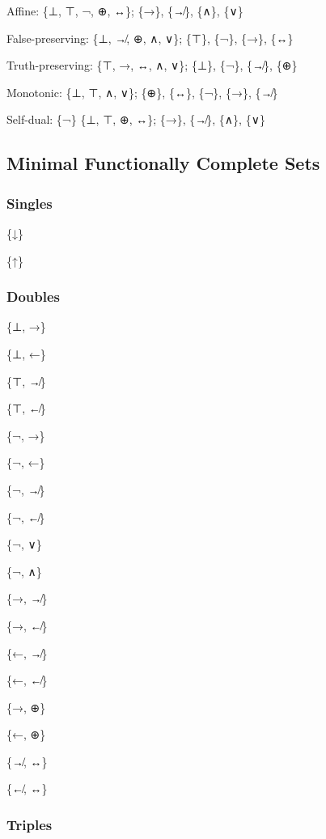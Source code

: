 Affine: \{⊥, ⊤, ¬, ⊕, ↔\}; \{→\}, \{↛\}, \{∧\}, \{∨\}

False-preserving: \{⊥, ↛, ⊕, ∧, ∨\}; \{⊤\}, \{¬\}, \{→\}, \{↔\}

Truth-preserving: \{⊤, →, ↔, ∧, ∨\}; \{⊥\}, \{¬\}, \{↛\}, \{⊕\}

Monotonic: \{⊥, ⊤, ∧, ∨\}; \{⊕\}, \{↔\}, \{¬\}, \{→\}, \{↛\}

Self-dual: \{¬\} \{⊥, ⊤, ⊕, ↔\}; \{→\}, \{↛\}, \{∧\}, \{∨\}

\hypertarget{minimal-functionally-complete-sets}{%
\subsection{Minimal Functionally Complete
Sets}\label{minimal-functionally-complete-sets}}

\hypertarget{singles}{%
\subsubsection{Singles}\label{singles}}

\{↓\}

\{↑\}

\hypertarget{doubles}{%
\subsubsection{Doubles}\label{doubles}}

\{⊥, →\}

\{⊥, ←\}

\{⊤, ↛\}

\{⊤, ↚\}

\{¬, →\}

\{¬, ←\}

\{¬, ↛\}

\{¬, ↚\}

\{¬, ∨\}

\{¬, ∧\}

\{→, ↛\}

\{→, ↚\}

\{←, ↛\}

\{←, ↚\}

\{→, ⊕\}

\{←, ⊕\}

\{↛, ↔\}

\{↚, ↔\}

\hypertarget{triples}{%
\subsubsection{Triples}\label{triples}}

